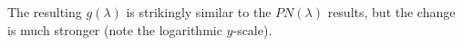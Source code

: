 \documentclass[onecolumn,fleqn]{revtex4}
\begin{document}
The resulting $g(\lambda)$ is strikingly similar to the $PN(\lambda)$ results,
but the change is much stronger (note the logarithmic $y$-scale).  


\begin{figure}[H]
  \\
\end{figure}
\end{document}
